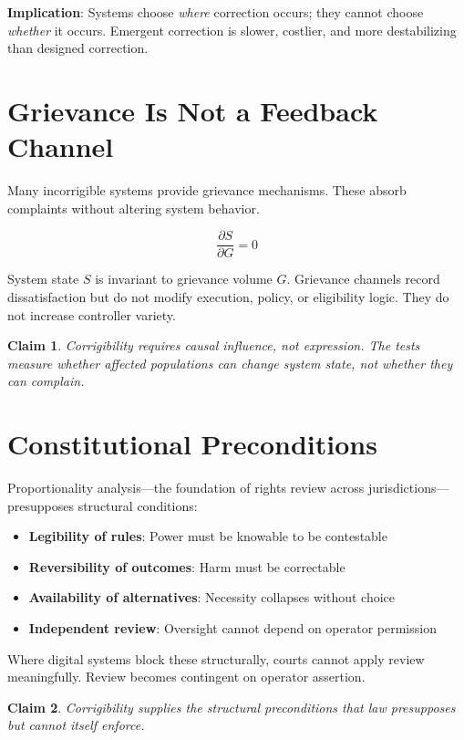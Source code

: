 \documentclass[11pt,a4paper]{article}
\newtheorem{claim}{Claim}
\begin{document}
\textbf{Implication}: Systems choose \textit{where} correction occurs; they cannot choose \textit{whether} it occurs. Emergent correction is slower, costlier, and more destabilizing than designed correction.

\section{Grievance Is Not a Feedback Channel}

Many incorrigible systems provide grievance mechanisms. These absorb complaints without altering system behavior.

\begin{equation}
\frac{\partial S}{\partial G} = 0
\end{equation}

System state $S$ is invariant to grievance volume $G$. Grievance channels record dissatisfaction but do not modify execution, policy, or eligibility logic. They do not increase controller variety.

\begin{claim}
Corrigibility requires causal influence, not expression. The tests measure whether affected populations can change system state, not whether they can complain.
\end{claim}

\section{Constitutional Preconditions}

Proportionality analysis---the foundation of rights review across jurisdictions---presupposes structural conditions:

\begin{itemize}
    \item \textbf{Legibility of rules}: Power must be knowable to be contestable
    \item \textbf{Reversibility of outcomes}: Harm must be correctable
    \item \textbf{Availability of alternatives}: Necessity collapses without choice
    \item \textbf{Independent review}: Oversight cannot depend on operator permission
\end{itemize}

Where digital systems block these structurally, courts cannot apply review meaningfully. Review becomes contingent on operator assertion.

\begin{claim}
Corrigibility supplies the structural preconditions that law presupposes but cannot itself enforce.
\end{claim}
\end{document}
